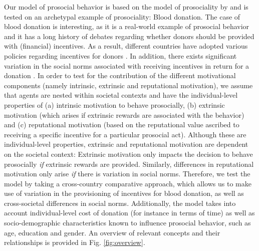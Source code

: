 \documentclass[AER]{AEA}
\begin{document}
Our model of prosocial behavior is based on the model of prosociality by \cite{benabou_incentives_2006} and is tested on an archetypal example of prosociality: Blood donation. The case of blood donation is interesting, as it is a real-world example of prosocial behavior and it has a long history of debates regarding whether donors should be provided with (financial) incentives. As a result, different countries have adopted various policies regarding incentives for donors \citep{chell_systematic_2018, healy_embedded_2000}. In addition, there exists significant variation in the social norms associated with receiving incentives in return for a donation \citep{costa-font_not_2013}. In order to test for the contribution of the different motivational components (namely intrinsic, extrinsic and reputational motivation), we assume that agents are nested within societal contexts and have the individual-level properties of (a) intrinsic motivation to behave prosocially, (b) extrinsic motivation (which arises if extrinsic rewards are associated with the behavior) and (c) reputational motivation (based on the reputational value ascribed to receiving a specific incentive for a particular prosocial act). Although these are individual-level properties, extrinsic and reputational motivation are dependent on the societal context: Extrinsic motivation only impacts the decision to behave prosocially \textit{if} extrinsic rewards are provided. Similarly, differences in reputational motivation only arise \textit{if} there is variation in social norms. Therefore, we test the model by taking a cross-country comparative approach, which allows us to make use of variation in the provisioning of incentives for blood donation, as well as cross-societal differences in social norms. Additionally, the model takes into account individual-level cost of donation (for instance in terms of time) as well as socio-demographic characteristics known to influence prosocial behavior, such as age, education and gender. An overview of relevant concepts and their relationships is provided in Fig. \ref{fig:overview}. 
\end{document}
